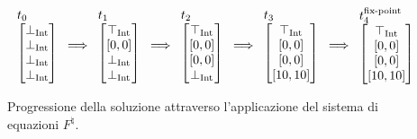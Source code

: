 \begin{figure}[H]
    \centering
\[
\arraycolsep=1.1pt
\begin{array}{ccccccccc}
    \begin{tabular}{l}
    $
    t_0
    $ \\
    $
    \begin{bmatrix}
       \perp_{\textrm{Int}} \\
       \perp_{\textrm{Int}} \\
       \perp_{\textrm{Int}} \\
       \perp_{\textrm{Int}}
    \end{bmatrix}
    $
    \end{tabular}
    &
    \Longrightarrow
    &
    \begin{tabular}{l}
    $t_1$ \\
    $
    \begin{bmatrix}
       \top_{\textrm{Int}} \\
       [0, 0] \\
       \perp_{\textrm{Int}} \\
       \perp_{\textrm{Int}}
    \end{bmatrix}
    $
    \end{tabular}
    &
    \Longrightarrow
    &
    \begin{tabular}{l}
    $t_2$ \\
    $
    \begin{bmatrix}
       \top_{\textrm{Int}} \\
       [0, 0] \\
       [0, 0] \\
       \perp_{\textrm{Int}}
    \end{bmatrix}
    $
    \end{tabular}
    &
    \Longrightarrow
    &
    \begin{tabular}{l}
    $t_3$ \\
    $
    \begin{bmatrix}
       \top_{\textrm{Int}} \\
       [0, 0] \\
       [0, 0] \\
       [10, 10]
    \end{bmatrix}
    $
    \end{tabular}
    &
    \Longrightarrow
    &
    \begin{tabular}{l}
    $t_4^{\textrm{fix-point}}$ \\
    $
    \begin{bmatrix}
       \top_{\textrm{Int}} \\
       [0, 0] \\
       [0, 0] \\
       [10, 10]
    \end{bmatrix}
    $
    \end{tabular}

\end{array}
\]
    \caption{Progressione della soluzione attraverso l'applicazione del sistema di equazioni \(F^{\natural}\).}
    \label{fig:progression_abstr}
\end{figure}

